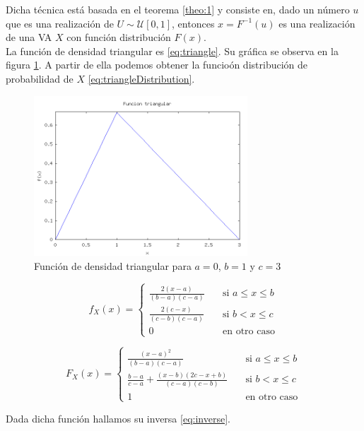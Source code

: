 \documentclass{sig-alternate}
\begin{document}
Dicha t\'ecnica est\'a basada en el teorema \ref{theo:1} y consiste
en, dado un n\'umero $u$ que es una realizaci\'on de $U\sim\mathcal{U}[0,1]$,
entonces $x = F^{-1}(u)$ es una realizaci\'on de una VA $X$ con funci\'on
distribuci\'on $F(x)$.\\

La funci\'on de densidad triangular es \eqref{eq:triangle}. Su gr\'afica se observa
en la figura \ref{fig:triangle_fun}. A partir de ella podemos obtener
la funcio\'on distribuci\'on de probabilidad de $X$
\eqref{eq:triangleDistribution}.


\begin{figure}[ht]
\label{fig:triangle_fun}
\includegraphics[width=8cm]{triangular}
\caption{Funci\'on de densidad triangular para $a=0$, $b=1$ y $c=3$}
\end{figure}


\begin{equation}
\label{eq:triangle}
f_{X}(x) =
\begin{cases}
\frac{2(x-a)}{(b-a)(c-a)} \quad & \text{si } a \leq x \leq b \\
\frac{2(c-x)}{(c-b)(c-a)} \quad & \text{si } b < x \leq c \\
0 \quad & \text{en otro caso}
\end{cases}
\end{equation}

\begin{equation}
\label{eq:triangleDistribution}
F_{X}(x) =
\begin{cases}
\frac{(x-a)^{2}}{(b-a)(c-a)} \quad & \text{si } a \leq x \leq b \\
\frac{b-a}{c-a} + \frac{(x-b)(2c-x+b)}{(c-a)(c-b)} \quad & \text{si } b < x \leq c \\
1 \quad & \text{en otro caso}
\end{cases}
\end{equation}

Dada dicha funci\'on hallamos su inversa \eqref{eq:inverse}.\\
\end{document}
